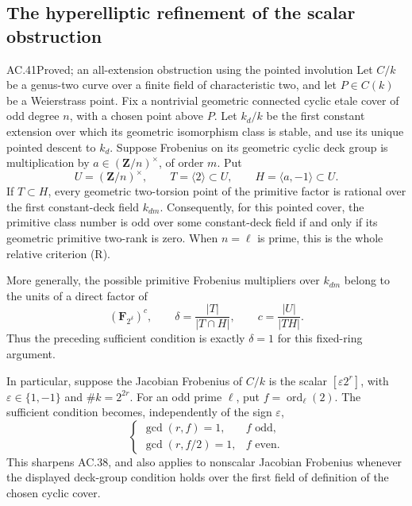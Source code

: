 \subsection{The hyperelliptic refinement of the scalar obstruction}

\begin{claim}{AC.41}{Proved; an all-extension obstruction using the pointed involution}
Let $C/k$ be a genus-two curve over a finite field of
characteristic two, and let $P\in C(k)$ be a Weierstrass
point. Fix a nontrivial geometric connected cyclic etale
cover of odd degree $n$, with a chosen point above $P$.
Let $k_d/k$ be the first constant extension over which
its geometric isomorphism class is stable, and use its
unique pointed descent to $k_d$. Suppose Frobenius on
its geometric cyclic deck group is multiplication by
$a\in(\mathbf Z/n)^\times$, of order $m$. Put
\[
 U=(\mathbf Z/n)^\times,\qquad
 T=\langle2\rangle\subset U,\qquad
 H=\langle a,-1\rangle\subset U.
\]
If $T\subset H$, every geometric two-torsion point of
the primitive factor is rational over the first
constant-deck field $k_{dm}$. Consequently, for this
pointed cover, the primitive class number is odd over
some constant-deck field if and only if its geometric
primitive two-rank is zero. When $n=\ell$ is prime,
this is the whole relative criterion \textup{(R)}.

More generally, the possible primitive Frobenius
multipliers over $k_{dm}$ belong to the units of a
direct factor of
\[
 \left(\mathbf F_{2^{\delta}}\right)^c,
 \qquad
 \delta=\frac{|T|}{|T\cap H|},\qquad
 c=\frac{|U|}{|TH|}.                              \tag{AC.41.1}
\]
Thus the preceding sufficient condition is exactly
$\delta=1$ for this fixed-ring argument.

In particular, suppose the Jacobian Frobenius of $C/k$
is the scalar $[\varepsilon2^r]$, with
$\varepsilon\in\{1,-1\}$ and $\#k=2^{2r}$.
For an odd prime $\ell$, put $f=\operatorname{ord}_\ell(2)$.
The sufficient condition becomes, independently of the
sign $\varepsilon$,
\[
 \begin{cases}
  \gcd(r,f)=1,&f\text{ odd},\\
  \gcd(r,f/2)=1,&f\text{ even}.
 \end{cases}                                      \tag{AC.41.2}
\]
This sharpens AC.38, and also applies to nonscalar
Jacobian Frobenius whenever the displayed deck-group
condition holds over the first field of definition of
the chosen cyclic cover.
\end{claim}
